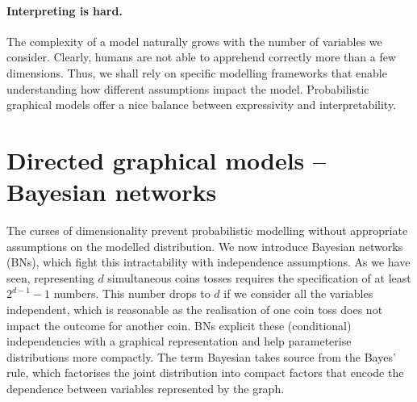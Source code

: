 \paragraph{Interpreting is hard.} The complexity of a model naturally grows with the number of variables we consider. Clearly, humans are not able to apprehend correctly more than a few dimensions. Thus, we shall rely on specific modelling frameworks that enable understanding how different assumptions impact the model. Probabilistic graphical models offer a nice balance between expressivity and interpretability.

\section{Directed graphical models -- Bayesian networks}
The curses of dimensionality prevent probabilistic modelling without appropriate assumptions on the modelled distribution. We now introduce Bayesian networks (BNs), which fight this intractability with independence assumptions. As we have seen, representing $d$ simultaneous coins tosses requires the specification of at least $2^{d-1} - 1$ numbers. This number drops to $d$ if we consider all the variables independent, which is reasonable as the realisation of one coin toss does not impact the outcome for another coin. BNs explicit these (conditional) independencies with a graphical representation and help parameterise distributions more compactly. The term Bayesian takes source from the Bayes' rule, which factorises the joint distribution into compact factors that encode the dependence between variables represented by the graph.


